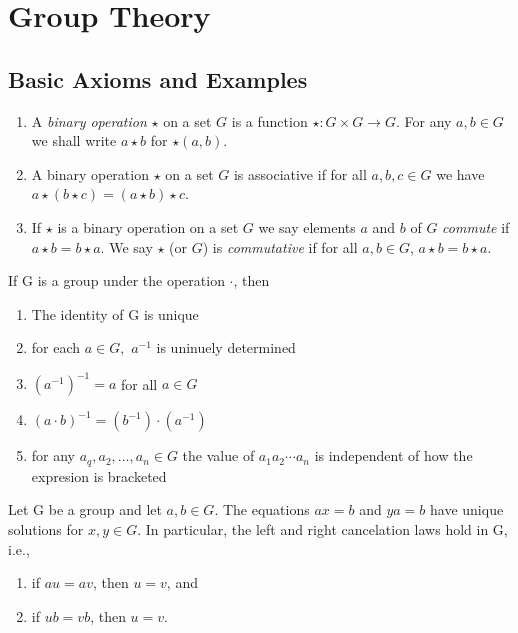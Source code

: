 \documentclass[../main]{subfiles}
\begin{document}
 
 \section{Group Theory}
 
 \subsection{Basic Axioms and Examples}
 
 
 \begin{dfn}
  \begin{enumerate}
   \item A \textit{binary operation} $\star$ on a set $G$ is a function $\star \colon G\times G \to G$. For any $a,b\in G$ we shall write $a\star b$ for $\star (a,b)$.
   \item A binary operation $\star$ on a set $G$ is associative if for all $a,b,c\in G$ we have $a\star (b\star c)=(a\star b)\star c$.
   \item If $\star$ is a binary operation on a set $G$ we say elements $a$ and $b$ of $G$ \textit{commute} if $a\star b = b\star a$. We say $\star$ (or $G$) is \textit{commutative} if for all $a,b\in G$, $a\star b = b\star a$.
  \end{enumerate}
 \end{dfn}
 
 \begin{prop}
  If G is a group under the operation $\cdot$, then
  \begin{enumerate}
   \item The identity of G is unique 
   \item for each $a \in G,$ $a^{-1}$ is uninuely determined
   \item $(a^{-1})^{-1} = a$ for all $a \in G$
   \item $(a\cdot b)^{-1}=(b^{-1})\cdot(a^{-1})$
   \item for any $a_q,a_2, \ldots,a_n\in G$ the value of $a_1 a_2 \cdots a_n$ is independent of how the expresion is bracketed 
  \end{enumerate}
 \end{prop}

 \begin{prop}
  Let G be a group and let $a,b\in G$. The equations $ax=b$ and $ya=b$ have unique solutions for $x,y \in G$. In particular, the left and right cancelation laws hold in G, i.e.,
  \begin{enumerate}
   \item if $au=av$, then $u=v$, and 
   \item if $ub=vb$, then $u=v$.
  \end{enumerate}
 \end{prop}
\end{document}
